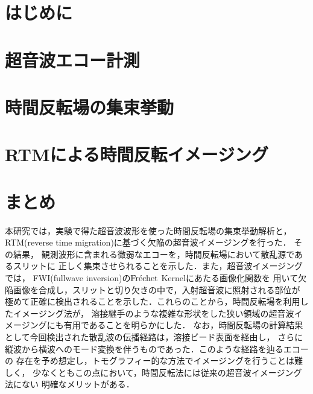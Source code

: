 ﻿\documentclass{jjsce}
\begin{document}
\section{はじめに}
	
\section{超音波エコー計測}
	
\section{時間反転場の集束挙動}
	
\section{RTMによる時間反転イメージング}
	
\section{まとめ}
本研究では，実験で得た超音波波形を使った時間反転場の集束挙動解析と，
RTM(reverse time migration)に基づく欠陥の超音波イメージングを行った．
その結果，
観測波形に含まれる微弱なエコーを，時間反転場において散乱源であるスリットに
正しく集束させられることを示した．また，超音波イメージングでは，
FWI(fullwave inversion)の${\rm Fr\acute{e}chet}$ Kernelにあたる画像化関数を
用いて欠陥画像を合成し，スリットと切り欠きの中で，入射超音波に照射される部位が
極めて正確に検出されることを示した．これらのことから，時間反転場を利用したイメージング法が，
溶接継手のような複雑な形状をした狭い領域の超音波イメージングにも有用であることを明らかにした．
なお，時間反転場の計算結果として今回検出された散乱波の伝播経路は，溶接ビード表面を経由し，
さらに縦波から横波へのモード変換を伴うものであった．このような経路を辿るエコーの
存在を予め想定し，トモグラフィー的な方法でイメージングを行うことは難しく，
少なくともこの点において，時間反転法には従来の超音波イメージング法にない
明確なメリットがある．
\end{document}
